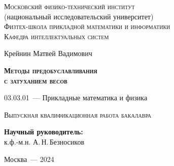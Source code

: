 \thispagestyle{empty}

\begin{titlepage}
    \begin{center}
        \textsc{Московский физико-технический институт}\\
        (национальный исследовательский университет)\\
        \textsc{Физтех-школа прикладной математики и информатики}\\
        \textsc{Кафедра интеллектуальных систем}
        \end{center}
        \vspace{2.5cm}
        \begin{center}
        {Крейнин Матвей Вадимович}
        \par
        \vspace{2cm}
        {\Large \textsc{\textbf{Методы предобуславливания \\ с затуханием весов}}}
        \par
        \vspace{2cm}
        {03.03.01~--- Прикладные математика и физика}
        \par
        \vspace{2cm}
        \textsc{Выпускная квалификационная работа бакалавра}
        \end{center}
        \vspace{2cm}
        \hfill\parbox{8.4cm}{\textbf{Научный руководитель:}
        \\к.ф.-м.н. А.\,Н.\,Безносиков}
        \par
        \vspace{2.5cm}
        \begin{center}
        {Москва~--- 2024}
    \end{center}
\end{titlepage}